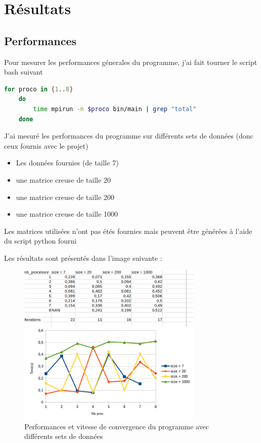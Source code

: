 \documentclass[11pt, a4paper]{article}
\begin{document}
\newpage

\section{Résultats}

\subsection{Performances}

Pour mesurer les performances génerales du programme, j'ai fait tourner le script bash suivant

\begin{lstlisting}[language=bash]
    for proco in {1..8}                                      
    do                
        time mpirun -n $proco bin/main | grep "total"
    done
\end{lstlisting}

J'ai mesuré les performances du programme sur différents sets de données (donc ceux fournis avec le projet)
\begin{itemize}
    \item Les données fournies (de taille 7)
    \item une matrice creuse de taille 20
    \item une matrice creuse de taille 200
    \item une matrice creuse de taille 1000\\
\end{itemize}

Les matrices utilisées n'ont pas étés fournies mais peuvent \^etre générées à l'aide du script python fourni

Les résultats sont présentés dans l'image suivante :

\begin{figure}[h]
    \centering
    \includegraphics[width=250pt]{perf.png}
    \caption{Performances et vitesse de convergence du programme avec différents sets de données}
\end{figure}
\end{document}
